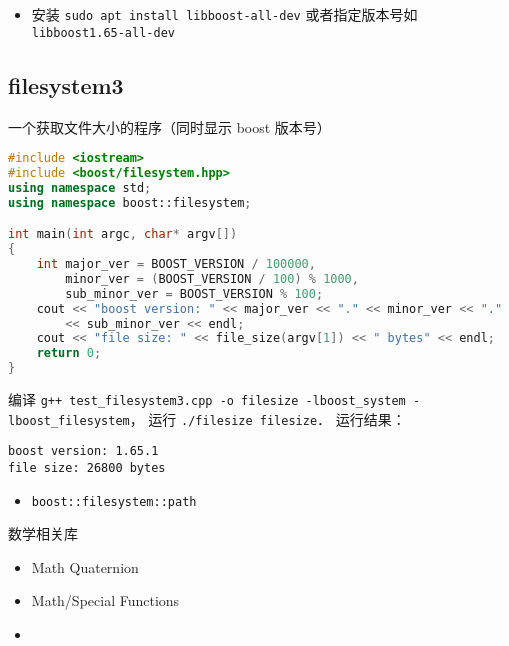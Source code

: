 
\begin{itemize}
\item 安装 \verb|sudo apt install libboost-all-dev| 或者指定版本号如 \verb|libboost1.65-all-dev|
\end{itemize}

\subsection{filesystem3}
一个获取文件大小的程序（同时显示 boost 版本号）
\begin{lstlisting}[language=cpp, caption=test_filesystem3.cpp]
#include <iostream>
#include <boost/filesystem.hpp>
using namespace std;
using namespace boost::filesystem;

int main(int argc, char* argv[])
{
	int major_ver = BOOST_VERSION / 100000,
        minor_ver = (BOOST_VERSION / 100) % 1000,
		sub_minor_ver = BOOST_VERSION % 100;
	cout << "boost version: " << major_ver << "." << minor_ver << "."
        << sub_minor_ver << endl;
	cout << "file size: " << file_size(argv[1]) << " bytes" << endl;
	return 0;
}
\end{lstlisting}

编译 \verb|g++ test_filesystem3.cpp -o filesize -lboost_system -lboost_filesystem|， 运行 \verb|./filesize filesize|． 运行结果：
\begin{lstlisting}[language=plain]
boost version: 1.65.1
file size: 26800 bytes
\end{lstlisting}

\begin{itemize}
\item \verb|boost::filesystem::path|
\end{itemize}

数学相关库
\begin{itemize}
\item Math Quaternion
\item Math/Special Functions
\item 
\end{itemize}
